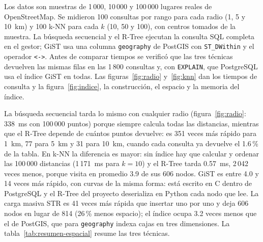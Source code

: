 Los datos son muestras de 1\,000, 10\,000 y 100\,000 lugares reales de OpenStreetMap. Se
midieron 100 consultas por rango para cada radio (1, 5 y 10~km) y 100 k-NN para cada $k$
(10, 50 y 100), con centros tomados de la muestra. La búsqueda secuencial y el R-Tree
ejecutan la consulta SQL completa en el gestor; GiST usa una columna \texttt{geography} de
PostGIS con \texttt{ST\_DWithin} y el operador \texttt{<->}. Antes de comparar tiempos se
verificó que las tres técnicas devuelven las mismas filas en las 1\,800 consultas y, con
\texttt{EXPLAIN}, que PostgreSQL usa el índice GiST en todas. Las figuras~\ref{fig:radio}
y~\ref{fig:knn} dan los tiempos de consulta y la figura~\ref{fig:indice}, la construcción, el
espacio y la memoria del índice.



La búsqueda secuencial tarda lo mismo con cualquier radio (figura~\ref{fig:radio}: 338~ms con 100\,000 puntos)
porque siempre calcula todas las distancias, mientras que el R-Tree depende de cuántos
puntos devuelve: es 351 veces más rápido para 1~km, 77 para 5~km y 31 para 10~km, cuando
cada consulta ya devuelve el 1.6\,\% de la tabla. En k-NN la diferencia es mayor: sin
índice hay que calcular y ordenar las 100\,000 distancias (1\,171~ms para $k = 10$) y el
R-Tree tarda 0.57~ms, 2\,042 veces menos, porque visita en promedio 3.9 de sus 606 nodos.
GiST es entre 4.0 y 14 veces más rápido, con curvas de la misma forma: está escrito en C
dentro de PostgreSQL y el R-Tree del proyecto deserializa en Python cada nodo que lee. La
carga masiva STR es 41 veces más rápida que insertar uno por uno y deja 606 nodos en lugar
de 814 (26\,\% menos espacio); el índice ocupa 3.2 veces menos que el de PostGIS, que para
\texttt{geography} indexa cajas en tres dimensiones. La tabla~\ref{tab:resumen-espacial} resume
las tres técnicas.

